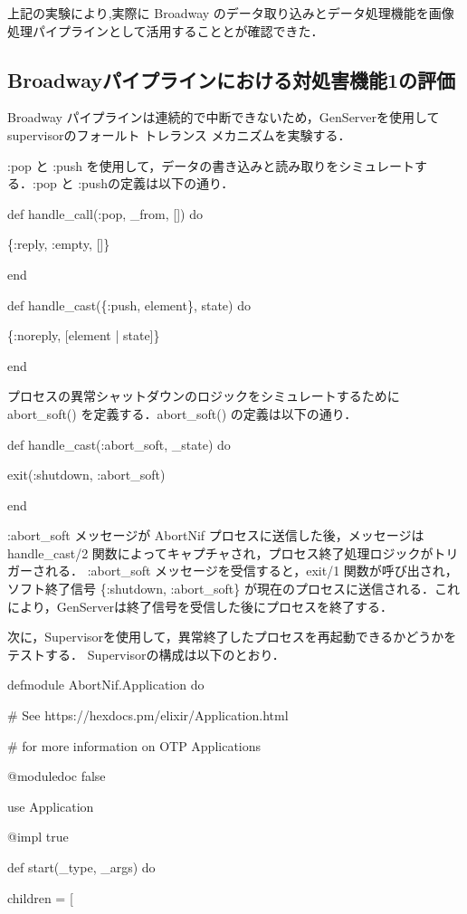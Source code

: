 \documentclass[a4paper]{jreport}	%
\begin{document}
上記の実験により,実際に Broadway のデータ取り込みとデータ処理機能を画像処理パイプラインとして活用することとが確認できた．

\subsection{Broadwayパイプラインにおける対処害機能1の評価} 
Broadway パイプラインは連続的で中断できないため，GenServerを使用してsupervisorのフォールト トレランス メカニズムを実験する．

:pop と :push を使用して，データの書き込みと読み取りをシミュレートする．:pop と :pushの定義は以下の通り．

def handle\_call(:pop, \_from, []) do

    \{:reply, :empty, []\}
    
  end

  def handle\_cast(\{:push, element\}, state) do
  
    \{:noreply, [element | state]\}
    
  end

プロセスの異常シャットダウンのロジックをシミュレートするために abort\_soft() を定義する．abort\_soft() の定義は以下の通り．

  def handle\_cast(:abort\_soft, \_state) do
  
    exit({:shutdown, :abort_soft})
    
  end

:abort\_soft メッセージが AbortNif プロセスに送信した後，メッセージは handle\_cast/2 関数によってキャプチャされ，プロセス終了処理ロジックがトリガーされる．
:abort\_soft メッセージを受信すると，exit/1 関数が呼び出され，ソフト終了信号 \{:shutdown, :abort\_soft\} が現在のプロセスに送信される．これにより，GenServerは終了信号を受信した後にプロセスを終了する．

次に，Supervisorを使用して，異常終了したプロセスを再起動できるかどうかをテストする．
Supervisorの構成は以下のとおり．

defmodule AbortNif.Application do

  \# See https://hexdocs.pm/elixir/Application.html
  
  \# for more information on OTP Applications
  
  @moduledoc false

  use Application

  @impl true
  
  def start(\_type, \_args) do
  
    children = [
    
\end{document}
